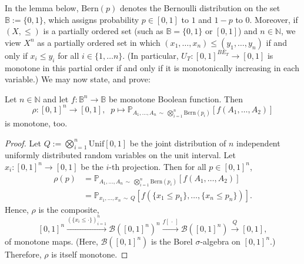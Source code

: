 \documentclass[runningheads]{llncs}
\begin{document}
In the lemma below, $\mathrm{Bern}(p)$ denotes the Bernoulli distribution on the set $\mathbb{B}:=\{0, 1\}$, 
which assigns probability $p\in [0,1]$ to $1$ and $1-p$ to $0$. 
Moreover, if $(X, \leq)$ is a partially ordered set (such as $\mathbb{B}=\{0, 1\}$ or $[0,1]$) 
and $n\in\mathbb{N}$, 
we view $X^n$ as a partially ordered set in which $(x_1, \dots, x_n) \leq (y_1, \dots, y_n)$ 
if and only if $x_i\leq y_i$ for all $i\in \{1, \dots n\}$. (In particular, $U_T: [0,1]^{BE_T}\to [0,1]$ is monotone in this partial order if and only if it is monotonically increasing in each variable.)
We may now state, and prove:

\begin{lemma}\label{lemma:monotonicity}
    Let $n\in \mathbb{N}$ and let $f: \mathbb{B}^n \to \mathbb{B}$ be monotone Boolean function.
    Then 
        $$ \rho : [0,1]^n \to [0,1], \;\; p \mapsto \mathbb{P}_{A_1,\dots, A_n \,\sim\, \bigotimes_{i=1}^n \mathrm{Bern}(p_i)}[f(A_1, \dots, A_2)] $$
    is monotone, too.
\end{lemma}
\begin{proof}
    Let $Q:= \bigotimes_{i=1}^{n} \mathrm{Unif}[0,1]$ 
    be the joint distribution of $n$ independent uniformly distributed
    random variables on the unit interval. 
    Let $x_i: [0,1]^n \to [0,1]$ be the $i$-th projection.
    Then for all $p\in [0,1]^n$,
    \begin{align*}
        \rho(p) &= \mathbb{P}_{A_1,\dots, A_n \,\sim\, \bigotimes_{i=1}^n \mathrm{Bern}(p_i)}[f(A_1, \dots, A_2)]\\
                &= \mathbb{P}_{x_1,\dots, x_n \,\sim\, Q}[f(\{x_1 \leq p_1\}, \dots, \{x_n \leq p_n\})].
    \end{align*}
    Hence, $\rho$ is the composite, 
        $$ [0,1]^n \xrightarrow{(\{x_i \leq \cdot\})_{i=1}^n} \mathcal{B}([0,1]^n)^n \xrightarrow{f[\,\cdot\,]} \mathcal{B}([0,1]^n) \xrightarrow{Q} [0,1],$$
    of monotone maps. 
    (Here, $\mathcal{B}([0,1]^n)$ is the Borel $\sigma$-algebra on $[0,1]^n$.) 
    Therefore, $\rho$ is itself monotone. 
\end{proof}



\end{document}
